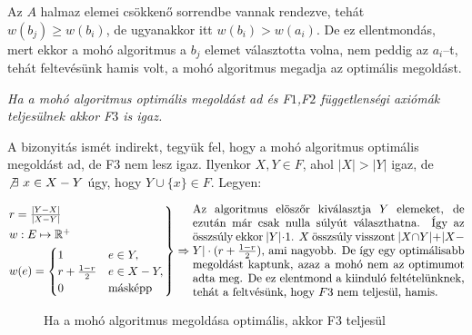 Az $A$ halmaz elemei csökkenő sorrendbe vannak rendezve, tehát $w(b_j) \geq
	w(b_i)$, de ugyanakkor itt $w(b_i) > w(a_i)$. De ez ellentmondás, mert ekkor a
mohó algoritmus a $b_j$ elemet választotta volna, nem peddig az $a_i$--t, tehát
feltevésünk hamis volt, a mohó algoritmus megadja az optimális megoldást.

\vspace{0.4cm}
\emph{Ha a mohó algoritmus optimális megoldást ad és F$1$,F$2$ függetlenségi axiómák
	teljesülnek akkor F$3$ is igaz.}
\vspace{0.4cm}

A bizonyitás ismét indirekt, tegyük fel, hogy a mohó algoritmus optimális megoldást ad, de
F$3$ nem lesz igaz. Ilyenkor $X,Y \in F$, ahol $|X|>|Y|$ igaz, de $\not \exists~x \in X-Y$ úgy, hogy
$Y \cup \{x\} \in F$. Legyen:

\[
	\begin{rcases}
		r=\frac{|Y-X|}{|X-Y|}      \\
		w : E \mapsto \mathbb{R}^+ \\
		w(e) = \begin{cases}
			       1                 & e \in Y,       \\
			       r + \frac{1-r}{2} & e \in X-Y,     \\
			       0                 & \mbox{másképp}
		       \end{cases}
	\end{rcases}\Rightarrow
	\parbox[L]{8.25cm}{
		Az algoritmus elöszőr kiválasztja $Y$ elemeket, de ezután már csak nulla súlyút
		választhatna. Így az összsúly ekkor $|Y|\cdot 1$. $X$ összsúly visszont $|X \cap
			Y| + |X-Y|\cdot(r+\frac{1-r}{2})$, ami nagyobb. De így egy optimálisabb megoldást
		kaptunk, azaz a mohó nem az optimumot adta meg. De ez elentmond a kiinduló feltételünknek,
		tehát a feltvésünk, hogy $F$3 nem teljesül, hamis. } \]

\begin{figure}[htbp]
	\centering
	\caption{Ha a mohó algoritmus megoldása optimális, akkor F3 teljesül}\label{fig:Mohó}
\end{figure}

